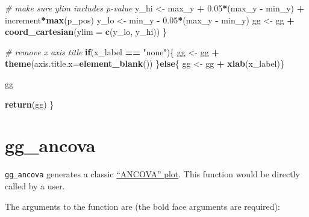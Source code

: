 \documentclass[]{book}
\newenvironment{Shaded}{\begin{snugshade}}{\end{snugshade}}
\newcommand{\CommentTok}[1]{\textcolor[rgb]{0.56,0.35,0.01}{\textit{#1}}}
\newcommand{\ControlFlowTok}[1]{\textcolor[rgb]{0.13,0.29,0.53}{\textbf{#1}}}
\newcommand{\DataTypeTok}[1]{\textcolor[rgb]{0.13,0.29,0.53}{#1}}
\newcommand{\FloatTok}[1]{\textcolor[rgb]{0.00,0.00,0.81}{#1}}
\newcommand{\KeywordTok}[1]{\textcolor[rgb]{0.13,0.29,0.53}{\textbf{#1}}}
\newcommand{\NormalTok}[1]{#1}
\newcommand{\OperatorTok}[1]{\textcolor[rgb]{0.81,0.36,0.00}{\textbf{#1}}}
\newcommand{\StringTok}[1]{\textcolor[rgb]{0.31,0.60,0.02}{#1}}
\begin{document}
\begin{Shaded}
\begin{Highlighting}[]
    \CommentTok{# make sure ylim includes p-value}
\NormalTok{    y_hi <-}\StringTok{ }\NormalTok{max_y }\OperatorTok{+}\StringTok{ }\FloatTok{0.05}\OperatorTok{*}\NormalTok{(max_y }\OperatorTok{-}\StringTok{ }\NormalTok{min_y) }\OperatorTok{+}
\StringTok{      }\NormalTok{increment}\OperatorTok{*}\KeywordTok{max}\NormalTok{(p_pos)}
\NormalTok{    y_lo <-}\StringTok{ }\NormalTok{min_y }\OperatorTok{-}\StringTok{ }\FloatTok{0.05}\OperatorTok{*}\NormalTok{(max_y }\OperatorTok{-}\StringTok{ }\NormalTok{min_y)}
\NormalTok{    gg <-}\StringTok{ }\NormalTok{gg }\OperatorTok{+}\StringTok{ }\KeywordTok{coord_cartesian}\NormalTok{(}\DataTypeTok{ylim =} \KeywordTok{c}\NormalTok{(y_lo, y_hi))}
\NormalTok{  \}}


  \CommentTok{# remove x axis title}
  \ControlFlowTok{if}\NormalTok{(x_label }\OperatorTok{==}\StringTok{ "none"}\NormalTok{)\{}
\NormalTok{    gg <-}\StringTok{ }\NormalTok{gg }\OperatorTok{+}\StringTok{ }\KeywordTok{theme}\NormalTok{(}\DataTypeTok{axis.title.x=}\KeywordTok{element_blank}\NormalTok{())}
\NormalTok{  \}}\ControlFlowTok{else}\NormalTok{\{}
\NormalTok{    gg <-}\StringTok{ }\NormalTok{gg }\OperatorTok{+}\StringTok{ }\KeywordTok{xlab}\NormalTok{(x_label)\}}

\NormalTok{  gg}

  \KeywordTok{return}\NormalTok{(gg)}
\NormalTok{\}}
\end{Highlighting}
\end{Shaded}

\hypertarget{gg_ancova}{%
\section{gg\_ancova}\label{gg_ancova}}

\texttt{gg\_ancova} generates a classic \href{presenting-results-as-ancova-plots}{``ANCOVA'' plot}. This function would be directly called by a user.

The arguments to the function are (the bold face arguments are required):
\end{document}
